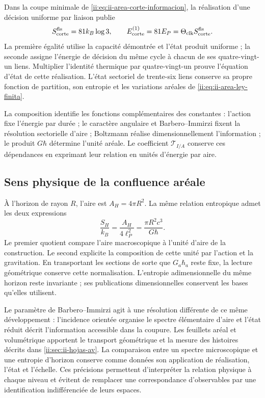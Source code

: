 Dans la coupe minimale de \eqref{ii:eq:ii-area-corte-informacion}, la
réalisation d’une décision uniforme par liaison publie
\begin{equation}
 S_{\rm corte}^{\rm fis}=81k_B\log3,
 \qquad
 E_{\rm corte}^{(1)}=81E_P
 =\Theta_{\rm clk}S_{\rm corte}^{\rm fis}.
 \label{ii:eq:ii-confluencia-corte-energia}
\end{equation}
La première égalité utilise la capacité démontrée et l’état produit
uniforme ; la seconde assigne l’énergie de décision du même cycle à
chacun de ses quatre-vingt-un liens. Multiplier l’identité thermique
par quatre-vingt-un prouve l’équation d’état de cette réalisation.
L’état sectoriel de trente-six liens conserve sa propre
fonction de partition, son entropie et les variations aréales de
\eqref{ii:eq:ii-area-ley-finita}.

La composition identifie les fonctions complémentaires des
constantes : l’action fixe l’énergie par durée ; le caractère angulaire
et Barbero--Immirzi fixent la résolution sectorielle d’aire ; Boltzmann
réalise dimensionnellement l’information ; le produit \(G\hbar\)
détermine l’unité aréale. Le coefficient \(\mathcal T_{I/A}\)
conserve ces dépendances en exprimant leur relation en unités
d’énergie par aire.

\subsection{Sens physique de la confluence aréale}

À l’horizon de rayon \(R\), l’aire est \(A_H=4\pi R^2\).
La même relation entropique admet les deux expressions
\[
 \frac{S_H}{k_B}=\frac{A_H}{4\ell_P^2}
 =\frac{\pi R^2c^3}{G\hbar}.
\]
Le premier quotient compare l’aire macroscopique à l’unité d’aire
de la construction. Le second explicite la composition de cette unité
par l’action et la gravitation. En transportant les sections de sorte
que \(G_a\hbar_a\) reste fixe, la lecture géométrique conserve
cette normalisation. L’entropie adimensionnelle du même horizon reste
invariante ; ses publications dimensionnelles conservent les bases qu’elles
utilisent.

Le paramètre de Barbero--Immirzi agit à une résolution différente
de ce même développement : l’incidence orientée organise le spectre
élémentaire d’aire et l’état réduit décrit l’information
accessible dans la coupure. Les feuillets aréal et volumétrique apportent le
transport géométrique et la mesure des histoires décrits dans
\cref{ii:sec:ii-hojas-av}. La comparaison entre un spectre microscopique
et une entropie d’horizon conserve comme données son application de réalisation,
l’état et l’échelle. Ces précisions permettent d’interpréter la
relation physique à chaque niveau et évitent de remplacer une correspondance
d’observables par une identification indifférenciée de leurs espaces.

